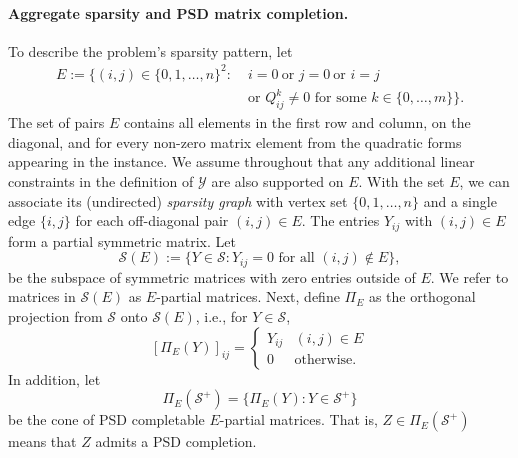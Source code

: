 \documentclass[twoside]{article}
\newcommand{\oo}[1]{{\textcolor{blue}{#1}}}
\newcommand{\jim}[1]{{ \oo{[Jim comment: #1}]}}
\begin{document}
	\paragraph{Aggregate sparsity and PSD matrix completion.}
	To describe the problem's sparsity pattern, let
	\begin{equation}
		\label{eq:E-definition}
		\begin{aligned}
			E := \bigl\{(i,j) \in \{0,1,\ldots,n\}^2:\;&
			i=0\ \text{or } j=0\ \text{or } i=j \\
			&\text{or } Q^k_{ij} \neq 0
			\text{ for some } k \in \{0,\ldots,m\}\bigr\}.
		\end{aligned}
	\end{equation}
	The set of pairs $E$ contains all elements in the first row and column, on the diagonal, and for every non-zero matrix element from the quadratic forms appearing in the instance.  We assume throughout that any additional linear constraints in the definition of $\mathcal Y$ are also supported on $E$.  With the set $E$, we can associate its (undirected) \emph{sparsity graph} with vertex set $\{0,1,\ldots,n\}$ and a single edge $\{i,j\}$ for each off-diagonal pair $(i,j) \in E$.
	The entries $Y_{ij}$ with $(i,j) \in E$ form a partial symmetric matrix. Let
	\begin{equation}
		\label{eq:se-subspace-def}
		\mathcal S(E):=\{Y \in \mathcal S : Y_{ij} = 0 \text{ for all } (i,j) \notin E\},
	\end{equation}
	be the subspace of symmetric matrices with zero entries outside of $E$.  We refer to matrices in $\mathcal S(E)$ as $E$-partial matrices.
	Next, define $\Pi_E$ as the orthogonal projection from $\mathcal{S}$ onto $\mathcal{S}(E)$, i.e., for $Y \in \mathcal{S}$, 
	\[ [\Pi_E(Y)]_{ij} = \begin{cases} Y_{ij} & (i,j) \in E \\
		0 & \text{otherwise}.\end{cases} \]
	In addition, let
	\begin{equation}
		\label{eq:psd-completable-matrices}
		\Pi_E(\mathcal{S}^+) = \{ \Pi_E(Y) : Y \in \mathcal{S}^+ \}
	\end{equation}
	be the cone of PSD completable $E$-partial matrices. That is, $Z \in \Pi_E(\mathcal{S}^+)$ means that $Z$ admits a PSD completion.
	
\end{document}
